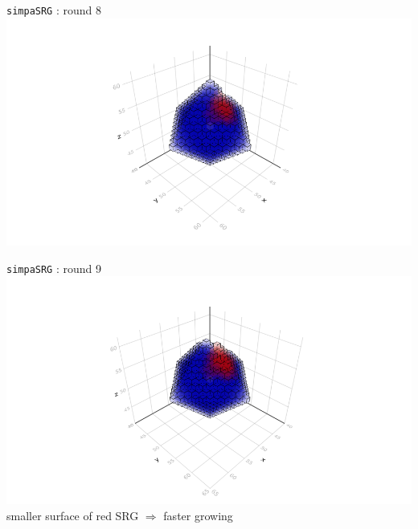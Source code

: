 \documentclass{beamer}
\begin{document}
\begin{frame}{\texttt{simpaSRG} : round 8}
\includegraphics[trim=5cm 0.7cm 5cm 3cm, clip, width=1\linewidth]{algorithm_visualisation/srgthreads2/srg2threads8.png}\\
\end{frame}
\begin{frame}{\texttt{simpaSRG} : round 9}
\includegraphics[trim=5cm 0.7cm 5cm 3cm, clip, width=1\linewidth]{algorithm_visualisation/srgthreads2/srg2threads9.png}\\
  smaller surface of red SRG $\Rightarrow$ faster growing\\
\end{frame}
\end{document}
